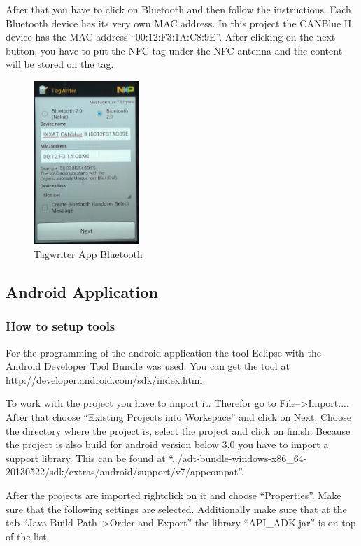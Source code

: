 \documentclass[11pt]{article}
\begin{document}
After that you have to click on Bluetooth and then follow the instructions. Each Bluetooth device has its very own MAC address. In this project the CANBlue II device has the MAC address "`00:12:F3:1A:C8:9E"'. After clicking on the next button, you have to put the NFC tag under the NFC antenna and the content will be stored on the tag.

\begin{figure}[H]

 \centering
 \includegraphics [width=4cm]{bluetooth.png} 
 \caption{Tagwriter App Bluetooth}
\end{figure}



\subsection{Android Application}

\subsubsection{How to setup tools}
For the programming of the android application the tool Eclipse with the Android Developer Tool Bundle was used. You can get the tool at\\ \url{http://developer.android.com/sdk/index.html}.

To work with the project you have to import it. Therefor go to File-->Import.... After that choose "`Existing Projects into Workspace"' and click on Next. Choose the directory where the project is, select the project and click on finish.
Because the project is also build for android version below 3.0 you have to import a support library. This can be found at "`../adt-bundle-windows-x86\_64-20130522/sdk/extras/android/support/v7/appcompat"'.

After the projects are imported rightclick on it and choose "`Properties"'. Make sure that the following settings are selected. Additionally make sure that at the tab "`Java Build Path-->Order and Export"' the library "`API\_ADK.jar"' is on top of the list.
\end{document}
